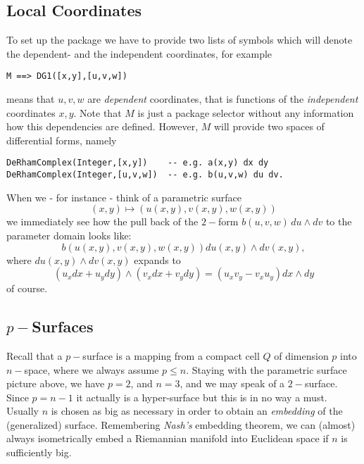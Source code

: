 \documentclass[12pt,a4paper]{article}
\begin{document}
\subsection{Local Coordinates}
To set up the package we have to provide two lists of symbols
which will denote the dependent- and the independent coordinates, for
example
\begin{lstlisting}
M ==> DG1([x,y],[u,v,w])
\end{lstlisting}
means that $u,v,w$ are {\em dependent} coordinates, that is functions
of the {\em independent} coordinates $x,y$. Note that $M$ is just
a package selector without any information how this dependencies
are defined. However, $M$ will provide two spaces of differential
forms, namely
\begin{lstlisting}
DeRhamComplex(Integer,[x,y])    -- e.g. a(x,y) dx dy
DeRhamComplex(Integer,[u,v,w])  -- e.g. b(u,v,w) du dv.
\end{lstlisting}
When we - for instance - think of a parametric surface 
\begin{displaymath}
   (x,y) \mapsto (u(x,y),v(x,y),w(x,y))
\end{displaymath} 
we immediately see how the pull back of the $2-$form $b(u,v,w)\,du\wedge dv$
to the parameter domain looks like:
\begin{displaymath}
  b(u(x,y),v(x,y),w(x,y)) du(x,y)\wedge dv(x,y),
\end{displaymath}  
where $du(x,y)\wedge dv(x,y)$ expands to
\begin{displaymath}
 (u_x dx + u_y dy)\wedge (v_x dx + v_y dy) = (u_x v_y - v_x u_y) dx\wedge dy
\end{displaymath}
of course. 
%
\subsection{$p-$Surfaces}
Recall that a $p-$surface is a mapping from a compact cell $Q$ of
dimension $p$ into $n-$space, where we always assume $p\leq n$.
Staying with the parametric surface picture above, we have $p=2$,
and $n=3$, and we may speak of a $2-$surface. Since $p=n-1$ it 
actually is a hyper-surface but this is in no way a must. Usually
$n$ is chosen as big as necessary in order to obtain an 
{\em embedding} of the (generalized) surface. Remembering {\em Nash's}
embedding theorem, we can (almost) always isometrically embed a Riemannian 
manifold into Euclidean space if $n$ is sufficiently big.
\end{document}

